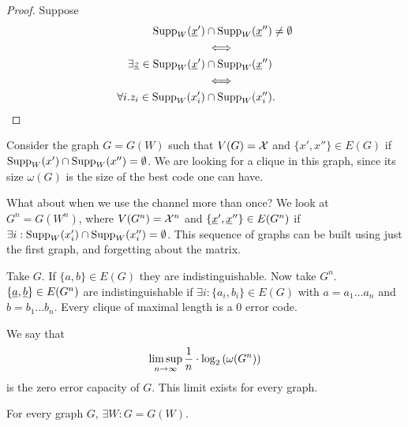 \begin{proof}
	Suppose 
	\begin{align*}
		\mathrm{Supp}_W(\underline{x}') & \cap \mathrm{Supp}_W(\underline{x}'') \neq \emptyset
		\\
		& \iff
		\\
		\exists \underline{z} \in \mathrm{Supp}_W(\underline{x}') & \cap \mathrm{Supp}_W(\underline{x}'')
		\\
		& \iff
		\\
		\forall i . 
		z_i \in \mathrm{Supp}_W(x_i') & \cap \mathrm{Supp}_W(x_i''). \qedhere
	\end{align*}
\end{proof}

Consider the graph $G = G(W)$ such that $V(G) = \mathcal{X}$ and $\{x', x''\} \in E(G)$ if $\mathrm{Supp}_W(x') \cap \mathrm{Supp}_W(x'') = \emptyset$.
We are looking for a clique in this graph, since its size $\omega(G)$ is the size of the best code one can have.

What about when we use the channel more than once?
We look at $G^n = G(W^n)$, where $V(G^n) = \mathcal{X}^n$ and $\{\underline{x}', \underline{x}''\} \in E(G^n)$ if $\exists i : \mathrm{Supp}_W(x_i') \cap \mathrm{Supp}_W(x_i'') = \emptyset$.
This sequence of graphs can be built using just the first graph, and forgetting about the matrix.

Take $G$.
If $\{a, b\} \in E(G)$ they are indistinguishable.
Now take $G^n$.
$\{\underline{a}, \underline{b}\} \in E(G^n)$ are indistinguishable if $\exists i : \{a_i, b_i\} \in E(G)$ with $a = a_1 \dots a_n$ and $b = b_1 \dots b_n$.
Every clique of maximal length is a 0 error code.

We say that 
\begin{equation*}
	\limsup_{n \to \infty} \frac{1}{n} \cdot \log_2 \left( {\omega(G^n)} \right)
\end{equation*}
is the zero error capacity of $G$.
This limit exists for every graph.

\begin{prop}
	For every graph $G$, $\exists W : G = G(W)$.
\end{prop}

